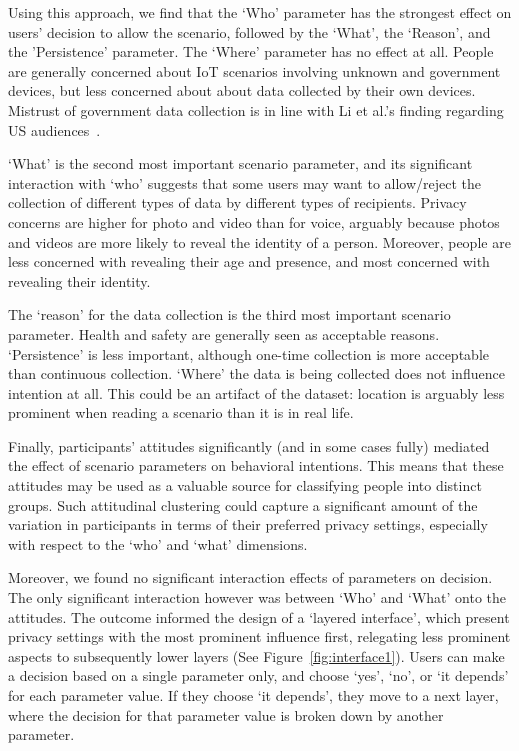 Using this approach, we find that the `Who' parameter has the strongest effect on users' decision to allow the scenario, followed by the `What', the `Reason', and the 'Persistence' parameter. The `Where' parameter has no effect at all. People are generally concerned about IoT scenarios involving unknown and government devices, but less concerned about about data collected by their own devices. Mistrust of government data collection is in line with Li et al.'s finding regarding US audiences~\cite{li2017cross}.

`What' is the second most important scenario parameter, and its significant interaction with `who' suggests that some users may want to allow/reject the collection of different types of data by different types of recipients. Privacy concerns are higher for photo and video than for voice, arguably because photos and videos are more likely to reveal the identity of a person. Moreover, people are less concerned with revealing their age and presence, and most concerned with revealing their identity.

The `reason' for the data collection is the third most important scenario parameter. Health and safety are generally seen as acceptable reasons. `Persistence' is less important, although one-time collection is more acceptable than continuous collection. `Where' the data is being collected does not influence intention at all. This could be an artifact of the dataset: location is arguably less prominent when reading a scenario than it is in real life.

Finally, participants' attitudes significantly (and in some cases fully) mediated the effect of scenario parameters on behavioral intentions. This means that these attitudes may be used as a valuable source for classifying people into distinct groups. Such attitudinal clustering could capture a significant amount of the variation in participants in terms of their preferred privacy settings, especially with respect to the `who' and `what' dimensions.

Moreover, we found no significant interaction effects of parameters on decision. The only significant interaction however was between `Who' and `What' onto the attitudes. The outcome informed the design of a `layered interface', which present privacy settings with the most prominent influence first, relegating less prominent aspects to subsequently lower layers (See Figure~\ref{fig:interface1}). Users can make a decision based on a single parameter only, and choose `yes', `no', or `it depends' for each parameter value. If they choose `it depends', they move to a next layer, where the decision for that parameter value is broken down by another parameter.

